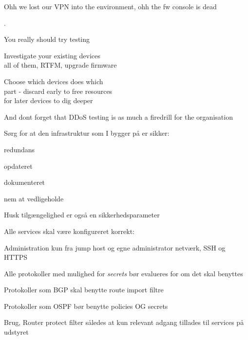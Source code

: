\documentclass[Screen16to9,17pt]{foils}
\begin{document}
\vskip 1cm
\centerline{Ohh we lost our VPN into the environment, ohh the fw console is dead}



.
\begin{list1}
\item You really should try testing
\item Investigate your existing devices\\
all of them, RTFM, upgrade firmware
\item Choose which devices does which\\
part - discard early to free resources\\
for later devices to dig deeper
\end{list1}

\vskip 3cm
\centerline{And dont forget that DDoS testing is as much a firedrill for the organisation}



\begin{list1}
\item Sørg for at den infrastruktur som I bygger på er sikker:
\begin{list2}
 \item redundans
       \item opdateret
        \item dokumenteret
        \item nem at vedligeholde
\end{list2}

\item  Husk tilgængelighed er også en sikkerhedsparameter
\end{list1}



\begin{list1}
\item Alle services skal være konfigureret korrekt:
\begin{list2}
\item Administration kun fra jump host og egne administrator netværk, SSH og HTTPS
\item Alle protokoller med mulighed for \emph{secrets} bør evalueres for om det skal benyttes
\item Protokoller som BGP skal benytte route import filtre
\item Protokoller som OSPF bør benytte policies OG secrets
\item Brug, Router protect filter således at kun relevant adgang tillades til services på udstyret
\end{list2}
\end{list1}
\end{document}
